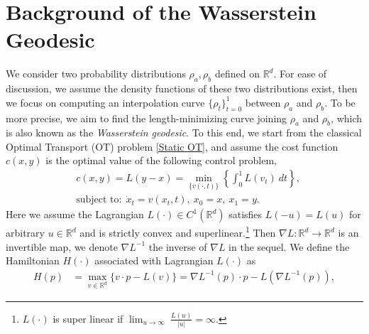 \documentclass{article}
\begin{document}
\section{Background of the Wasserstein Geodesic}
We consider two probability distributions $\rho_a, \rho_b$ defined on $\mathbb{R}^d$. For ease of discussion, we assume the density functions of these two distributions exist, then we focus on computing an interpolation curve $\{\rho_t\}_{t=0}^1$ between $\rho_a$ and $\rho_b$. To be more precise, we aim to find the length-minimizing curve joining $\rho_a$ and $\rho_b$, which is also known as the {\it Wasserstein geodesic}. 
To this end, we start from the classical Optimal Transport (OT) problem \eqref{Static OT}, and assume the cost function $c(x,y)$ is the optimal value of the following control problem,
\begin{align}
  & c(x, y) =L(y-x)  = \min_{\{{v}(\cdot, t)\}}  \left\{ \int_0^1 L({v}_t)~dt \right\},  \nonumber\\
  & \textrm{subject to:}~~\dot{x}_t={v}(x_t, t),~ x_0 = x,~ x_1 = y. \nonumber
\end{align}
Here we assume the Lagrangian $L(\cdot)\in C^1(\mathbb{R}^d)$ satisfies $L(-u)=L(u)$ for arbitrary $u\in \mathbb{R}^d$ and is strictly convex and superlinear.\footnote{$L(\cdot)$ is super linear if $\lim_{u\rightarrow \infty}~\frac{L(u)}{|u|}=\infty$.} Then $\nabla L:\mathbb{R}^d\rightarrow \mathbb{R}^d$ is an invertible map, we denote $\nabla L^{-1}$ the inverse of $\nabla L$ in the sequel. We define the Hamiltonian $H(\cdot)$ associated with Lagrangian $L(\cdot)$ as
\begin{align}
  H(p) & = \max_{v\in\mathbb{R}^d}\{v\cdot p - L(v)\} = \nabla L^{-1}(p)\cdot p - L(\nabla L^{-1}(p))\label{Legendre},  
\end{align}
\end{document}
